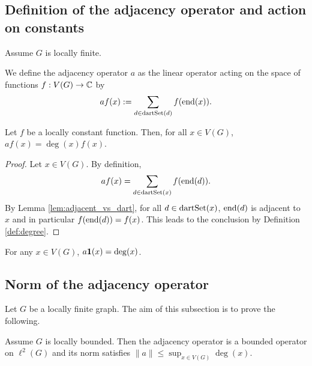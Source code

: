 \subsection{Definition of the adjacency operator and action on constants}

Assume $G$ is locally finite.

\begin{definition}
  \label{def:adjacency_operator}
  We define the adjacency operator $a$ as the linear operator acting on the space of
  functions $f : V(G) \rightarrow \mathbb{C}$ by
  $$ a f (x) :=
  \sum_{d \in \mathrm{dartSet}(d)}
  f(\mathrm{end}(x)).$$
\end{definition}

\begin{lemma}
  \label{lem:adjacency_locally_constant}
  Let $f$ be a locally constant function. Then, for all $x \in V(G)$,
  $af(x) = \deg(x) f(x)$.
\end{lemma}

\begin{proof}
  Let $x \in V(G)$.
  By definition,
  \begin{equation*}
    af(x) = \sum_{d \in \mathrm{dartSet}(x)} f(\mathrm{end}(d)).
  \end{equation*}
  By Lemma \ref{lem:adjacent_vs_dart},
  for all $d \in \mathrm{dartSet}(x)$, $\mathrm{end}(d)$ is adjacent to $x$
  and in particular $f(\mathrm{end}(d))=f(x)$. This leads to the conclusion by
  Definition \ref{def:degree}.
\end{proof}

\begin{lemma}
  \label{lem:adjacency_of_constant}
  For any $x \in V(G)$, $a \mathbf{1}(x) = \deg(x)$.
\end{lemma}

\subsection{Norm of the adjacency operator}

Let $G$ be a locally finite graph.
The aim of this subsection is to prove the following.

\begin{theorem}
  \label{thm:norm_adjacency_leq_sup_degree}
  Assume $G$ is locally bounded.
  Then the adjacency operator is a bounded operator on $\ell^2(G)$ and
  its norm satisfies $\|a\| \leq \sup_{x \in V(G)} \deg(x)$.
\end{theorem}

